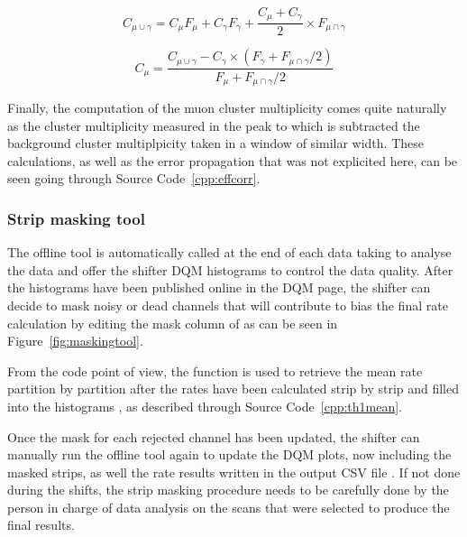 	\begin{equation}
	\label{eq:peakCS}
	C_{\mu\cup\gamma} = C_{\mu}F_{\mu} + C_{\gamma}F_{\gamma} + \frac{C_{\mu}+C_{\gamma}}{2} \times F_{\mu\cap\gamma}
	\end{equation}
	
	\begin{equation}
	\label{eq:muonCS}
	C_{\mu} = \frac{C_{\mu\cup\gamma} - C_{\gamma}\times(F_{\gamma}+F_{\mu\cap\gamma}/2)}{F_{\mu}+F_{\mu\cap\gamma}/2}
	\end{equation}
	
	Finally, the computation of the muon cluster multiplicity comes quite naturally as the cluster multiplicity measured in the peak to which is subtracted the background cluster multiplpicity taken in a window of similar width. These calculations, as well as the error propagation that was not explicited here, can be seen going through Source Code~\ref{cpp:effcorr}.
		
		\subsubsection{Strip masking tool}
		\label{app2:sssec:mask}
	
	The offline tool is automatically called at the end of each data taking to analyse the data and offer the shifter DQM histograms to control the data quality. After the histograms have been published online in the DQM page, the shifter can decide to mask noisy or dead channels that will contribute to bias the final rate calculation by editing the mask column of  as can be seen in Figure~\ref{fig:maskingtool}.
	
	From the code point of view, the function  is used to retrieve the mean rate partition by partition after the rates have been calculated strip by strip and filled into the histograms , as described through Source Code~\ref{cpp:th1mean}.
	
	Once the mask for each rejected channel has been updated, the shifter can manually run the offline tool again to update the DQM plots, now including the masked strips, as well the rate results written in the output CSV file . If not done during the shifts, the strip masking procedure needs to be carefully done by the person in charge of data analysis on the scans that were selected to produce the final results.
	
